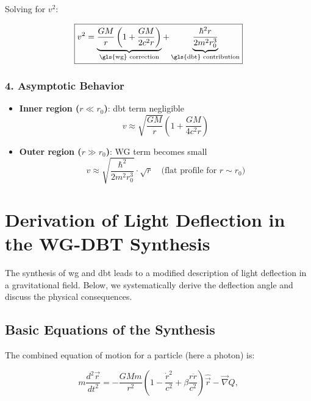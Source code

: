 Solving for $v^2$:

\begin{equation}
    \label{eq:rotationskurve}
    \boxed
    {
        v^2 = \underbrace{\frac{GM}{r}\left(1 + \frac{GM}{2c^2r}\right)}_{\text{\gls{wg} correction}} + \underbrace{\frac{\hbar^2 r}{2m^2 r_0^3}}_{\text{\gls{dbt} contribution}}
    }
\end{equation}

\subsubsection{4. Asymptotic Behavior}
\begin{itemize}
\item \textbf{Inner region ($r \ll r_0$)}: \gls{dbt} term negligible
\begin{equation}
v \approx \sqrt{\frac{GM}{r}} \left(1 + \frac{GM}{4c^2r}\right)
\end{equation}

\item \textbf{Outer region ($r \gg r_0$)}: WG term becomes small
\begin{equation}
v \approx \sqrt{\frac{\hbar^2}{2m^2 r_0^3}} \cdot \sqrt{r} \quad \text{(flat profile for $r \sim r_0$)}
\end{equation}
\end{itemize}

\section{Derivation of Light Deflection in the WG-DBT Synthesis}
\label{sec:lichtablenkung}

The synthesis of \gls{wg} and \gls{dbt} leads to a modified description of light deflection in a gravitational field. Below, we systematically derive the deflection angle and discuss the physical consequences.

\subsection{Basic Equations of the Synthesis}
The combined equation of motion for a particle (here a photon) is:

\begin{equation}
m \frac{d^2 \vec{r}}{dt^2} = -\frac{GMm}{r^2} \left(1 - \frac{\dot{r}^2}{c^2} + \beta \frac{r \ddot{r}}{c^2}\right) \hat{\vec{r}} - \vec{\nabla} Q,
\end{equation}

